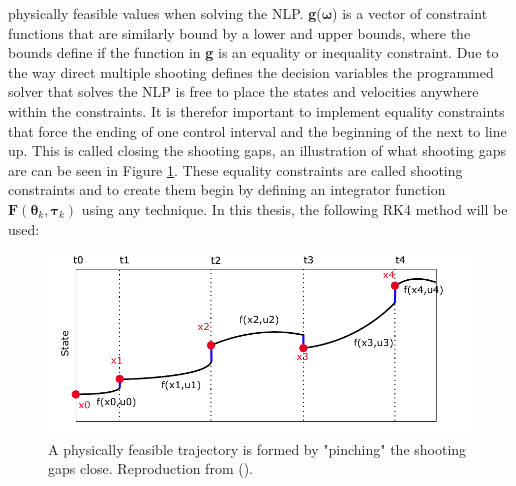 physically feasible values when solving the NLP. \textbf{g}($\bm{\omega}$) is a vector of constraint functions that are similarly bound
by a lower and upper bounds, where the bounds define if the function in \textbf{g} is an equality or inequality constraint. Due to the way direct multiple shooting
defines the decision variables the programmed solver that solves the \gls{NLP} is free to place the states and velocities anywhere within the constraints. It is therefor
important to implement equality constraints that force the ending of one control interval and the beginning of the next to line up. This is called closing the shooting gaps, 
an illustration of what shooting gaps are can be seen in Figure \ref{FIG: Shooting Gaps}. These equality constraints are called shooting constraints and to create them begin
by defining an integrator function $\textbf{F}(\bm{\theta}_{k}, \bm{\tau}_k)$ using any technique. In this thesis, the following \gls{RK4} method will be used:

\begin{figure}
    \includegraphics[width=\textwidth]{Images/MultipleShooting.pdf}
    \caption{A physically feasible trajectory is formed by "pinching" the shooting gaps close. Reproduction from (\cite{gros2017Lecture}).}
    \label{FIG: Shooting Gaps}
\end{figure}

